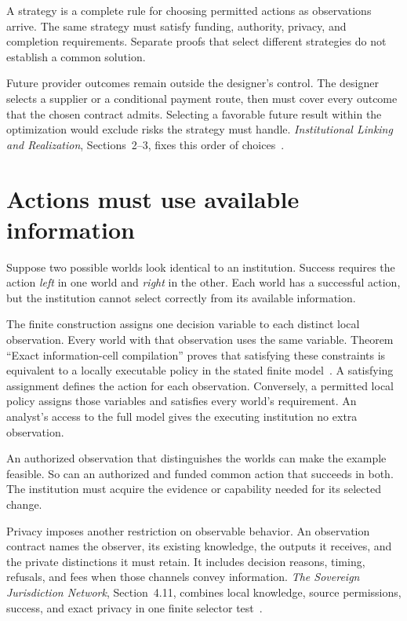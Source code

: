 \documentclass{momentum}
\begin{document}
A strategy is a complete rule for choosing permitted actions as observations arrive.
The same strategy must satisfy funding, authority, privacy, and completion requirements.
Separate proofs that select different strategies do not establish a common solution.

Future provider outcomes remain outside the designer's control.
The designer selects a supplier or a conditional payment route, then must cover every outcome that the chosen contract admits.
Selecting a favorable future result within the optimization would exclude risks the strategy must handle.
\emph{Institutional Linking and Realization}, Sections~2--3, fixes this order of choices~\cite{linking}.

\section{Actions must use available information}
\label{sec:observations}

Suppose two possible worlds look identical to an institution.
Success requires the action \emph{left} in one world and \emph{right} in the other.
Each world has a successful action, but the institution cannot select correctly from its available information.

The finite construction assigns one decision variable to each distinct local observation.
Every world with that observation uses the same variable.
Theorem ``Exact information-cell compilation'' proves that satisfying these constraints is equivalent to a locally executable policy in the stated finite model~\cite[Section~3]{linking}.
A satisfying assignment defines the action for each observation.
Conversely, a permitted local policy assigns those variables and satisfies every world's requirement.
An analyst's access to the full model gives the executing institution no extra observation.

An authorized observation that distinguishes the worlds can make the example feasible. So can an authorized and funded common action that succeeds in both.
The institution must acquire the evidence or capability needed for its selected change.

Privacy imposes another restriction on observable behavior.
An observation contract names the observer, its existing knowledge, the outputs it receives, and the private distinctions it must retain.
It includes decision reasons, timing, refusals, and fees when those channels convey information.
\emph{The Sovereign Jurisdiction Network}, Section~4.11, combines local knowledge, source permissions, success, and exact privacy in one finite selector test~\cite{recognition}.
\end{document}
